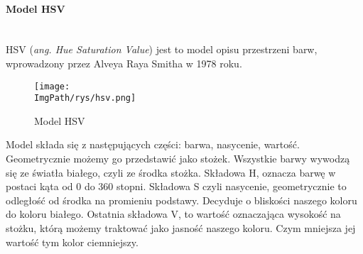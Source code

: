 \documentclass[a4paper,12pt,twoside,openany]{report}
\newcommand{\ImgPath}{.}
\begin{document}
\paragraph{Model HSV} \mbox{} \\ \indent
HSV (\textit{ang. Hue Saturation Value}) jest to model opisu przestrzeni barw, wprowadzony przez Alveya Raya Smitha w 1978 roku.

\begin{figure}[H]	
	\centering
	\texttt{[image: \\ImgPath/rys/hsv.png]}
	
	\caption{Model HSV}
\end{figure}

Model składa się z następujących części: barwa, nasycenie, wartość. Geometrycznie możemy go przedstawić jako stożek. Wszystkie barwy wywodzą się ze światła białego, czyli ze środka stożka. Składowa H, oznacza barwę w postaci kąta od 0 do 360 stopni. Składowa S czyli nasycenie, geometrycznie to odległość od środka na promieniu podstawy. Decyduje o bliskości naszego koloru do koloru białego. Ostatnia składowa V, to wartość oznaczająca wysokość na stożku, którą możemy traktować jako jasność naszego koloru. Czym mniejsza jej wartość tym kolor ciemniejszy\cite{Jankowski}.
\end{document}
